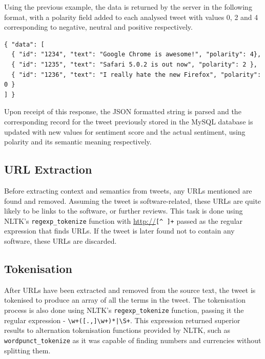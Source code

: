Using the previous example, the data is returned by the server in the following format, with a polarity field added to each analysed tweet with values 0, 2 and 4 corresponding to negative, neutral and positive respectively.
\begin{verbatim}
{ "data": [ 
  { "id": "1234", "text": "Google Chrome is awesome!", "polarity": 4},
  { "id": "1235", "text": "Safari 5.0.2 is out now", "polarity": 2 },
  { "id": "1236", "text": "I really hate the new Firefox", "polarity": 0 } 
] }
\end{verbatim}

Upon receipt of this response, the JSON formatted string is parsed and the corresponding record for the tweet previously stored in the MySQL database is updated with new values for sentiment score and the actual sentiment, using polarity and its semantic meaning respectively.

\subsection{URL Extraction}
Before extracting context and semantics from tweets, any URLs mentioned are found and removed. Assuming the tweet is software-related, these URLs are quite likely to be links to the software, or further reviews. This task is done using NLTK's \texttt{regexp\_tokenize} function with \url{http://}\verb/[^ ]+/ passed as the regular expression that finds URLs. If the tweet is later found not to contain any software, these URLs are discarded.

\subsection{Tokenisation}
After URLs have been extracted and removed from the source text, the tweet is tokenised to produce an array of all the terms in the tweet. The tokenisation process is also done using NLTK's \texttt{regexp\_tokenize} function, passing it the regular expression - \verb/\w+([.,]\w+)*|\S+/. This expression returned superior results to alternation tokenisation functions provided by NLTK, such as \texttt{wordpunct\_tokenize} as it was capable of finding numbers and currencies without splitting them.

